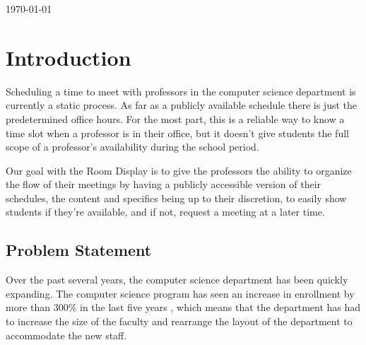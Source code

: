 \documentclass[12pt]{article}
\begin{document}
\begin{titlepage}
	\vfill\vfill\vfill %
	
	{\large\today} %
	
	
	 
	
	\vfill %
	
\end{titlepage}

\tableofcontents
\setcounter{tocdepth}{2}
\newpage


\section{Introduction}

Scheduling a time to meet with professors in the computer science department is currently a static process. As far as a publicly available schedule there is just the predetermined office hours. For the most part, this is a reliable way to know a time slot when a professor is in their office, but it doesn't give students the full scope of a professor's availability during the school period. 

Our goal with the Room Display is to give the professors the ability to organize the flow of their meetings by having a publicly accessible version of their schedules, the content and specifics being up to their discretion, to easily show students if they're available, and if not, request a meeting at a later time.

\subsection{Problem Statement}

Over the past several years, the computer science department has been quickly expanding. The computer science program has seen an increase in enrollment by more than 300\% in the last five years \cite{wfarticle}, which means that the department has had to increase the size of the faculty and rearrange the layout of the department to accommodate the new staff.
\end{document}
